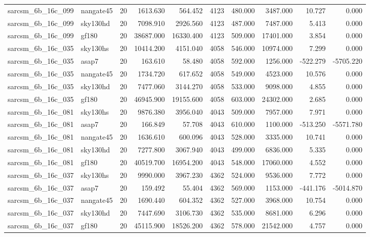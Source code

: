 \begin{tabular}{llrrrrrrrr}
sarcsm\_6b\_16c\_099 & nangate45 & 20 & 1613.630 & 564.452 & 4123 & 480.000 & 3487.000 & 10.727 & 0.000 \\
sarcsm\_6b\_16c\_099 & sky130hd & 20 & 7098.910 & 2926.560 & 4123 & 487.000 & 7487.000 & 5.413 & 0.000 \\
sarcsm\_6b\_16c\_099 & gf180 & 20 & 38687.000 & 16330.400 & 4123 & 509.000 & 17401.000 & 3.854 & 0.000 \\
sarcsm\_6b\_16c\_035 & sky130hs & 20 & 10414.200 & 4151.040 & 4058 & 546.000 & 10974.000 & 7.299 & 0.000 \\
sarcsm\_6b\_16c\_035 & asap7 & 20 & 163.610 & 58.480 & 4058 & 592.000 & 1256.000 & -522.279 & -5705.220 \\
sarcsm\_6b\_16c\_035 & nangate45 & 20 & 1734.720 & 617.652 & 4058 & 549.000 & 4523.000 & 10.576 & 0.000 \\
sarcsm\_6b\_16c\_035 & sky130hd & 20 & 7477.060 & 3144.270 & 4058 & 533.000 & 9098.000 & 4.855 & 0.000 \\
sarcsm\_6b\_16c\_035 & gf180 & 20 & 46945.900 & 19155.600 & 4058 & 603.000 & 24302.000 & 2.685 & 0.000 \\
sarcsm\_6b\_16c\_081 & sky130hs & 20 & 9876.380 & 3956.040 & 4043 & 509.000 & 7957.000 & 7.971 & 0.000 \\
sarcsm\_6b\_16c\_081 & asap7 & 20 & 166.849 & 57.708 & 4043 & 610.000 & 1100.000 & -513.250 & -5571.780 \\
sarcsm\_6b\_16c\_081 & nangate45 & 20 & 1636.610 & 600.096 & 4043 & 528.000 & 3335.000 & 10.741 & 0.000 \\
sarcsm\_6b\_16c\_081 & sky130hd & 20 & 7277.800 & 3067.940 & 4043 & 499.000 & 6836.000 & 5.335 & 0.000 \\
sarcsm\_6b\_16c\_081 & gf180 & 20 & 40519.700 & 16954.200 & 4043 & 548.000 & 17060.000 & 4.552 & 0.000 \\
sarcsm\_6b\_16c\_037 & sky130hs & 20 & 9990.000 & 3967.230 & 4362 & 524.000 & 9536.000 & 7.772 & 0.000 \\
sarcsm\_6b\_16c\_037 & asap7 & 20 & 159.492 & 55.404 & 4362 & 569.000 & 1153.000 & -441.176 & -5014.870 \\
sarcsm\_6b\_16c\_037 & nangate45 & 20 & 1690.440 & 604.352 & 4362 & 527.000 & 3968.000 & 10.754 & 0.000 \\
sarcsm\_6b\_16c\_037 & sky130hd & 20 & 7447.690 & 3106.730 & 4362 & 535.000 & 8681.000 & 6.296 & 0.000 \\
sarcsm\_6b\_16c\_037 & gf180 & 20 & 45115.900 & 18526.200 & 4362 & 578.000 & 21542.000 & 4.757 & 0.000 \\

\end{tabular}
